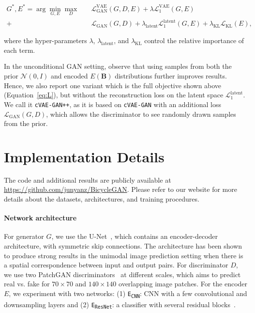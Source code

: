 \begin{equation}
\begin{split}
G^{*}, E^{*} = \arg\min_{G,E} \max_{D} \quad  & \mathcal{L}_{\text{GAN}}^{\text{VAE}}(G,D,E) + \lambda \mathcal{L}_1^{\text{VAE}}(G,E) \\
+& \mathcal{L}_{\text{GAN}}(G,D) + \lambda_{\text{latent}} \mathcal{L}_1^{\text{latent}}(G,E) + \lambda_{\text{KL}}\mathcal{L}_{\text{KL}}(E),
\end{split}
\label{eq:L}
\end{equation}

where the hyper-parameters $\lambda$, $\lambda_{\text{latent}}$, and $\lambda_{\text{KL}}$ control the relative importance of each term. 

In the unconditional GAN setting, \citet{larsen2016vaegan} observe that using samples from both the prior $\mathcal{N}(0,I)$ and encoded $E(\mathbf{B})$ distributions further improves results. Hence, we also report one variant which is the full objective shown above (Equation~\ref{eq:L}), but without the reconstruction loss on the latent space $\mathcal{L}_1^{\text{latent}}$. 
We call it \texttt{cVAE-GAN++}, as it is based on \texttt{cVAE-GAN} with an additional loss $\mathcal{L}_{\text{GAN}}(G, D)$, which allows the discriminator to see randomly drawn samples from the prior.

\section{Implementation Details}
\label{sec:implementation}
The code and additional results are publicly available at \url{https://github.com/junyanz/BicycleGAN}. Please refer to our website for more details about the datasets, architectures, and training procedures.

\paragraph{Network architecture} For generator $G$, we use the U-Net~\citep{ronneberger2015u}, which contains an encoder-decoder architecture, with symmetric skip connections. The architecture has been shown to produce strong results in the unimodal image prediction setting when there is a spatial correspondence between input and output pairs. For discriminator $D$, we use two PatchGAN discriminators~\citep{isola2016image} at different scales, which aims to predict real vs. fake for $70\times 70$ and $140 \times 140$ overlapping image patches. For the encoder $E$, we experiment with two networks: (1) \texttt{E\textsubscript{CNN}}: CNN with a few convolutional and downsampling layers and (2) \texttt{E\textsubscript{ResNet}}: a classifier with several residual blocks~\cite{he2016deep}.

